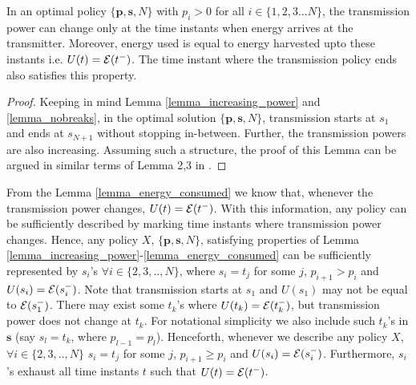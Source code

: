 %
%

\begin{lemma}
In an optimal policy $\{\bm{p},\bm{s},N\}$ with $p_i>0$ for all $i\in\{1,2,3...N\}$, the transmission power can change only at the time instants when energy arrives at the transmitter. Moreover, energy used is equal to energy harvested upto these instants i.e. $U(t) = \mathcal{E}(t^-)$. The time instant where the transmission policy ends also satisfies this property.
\label{lemma_energy_consumed} 
\end{lemma}
\begin{proof}
Keeping in mind Lemma \ref{lemma_increasing_power} and \ref{lemma_nobreaks}, in the optimal solution $\{\bm{p}, \bm{s}, N\}$, transmission starts at $s_1$ and ends at $s_{N+1}$ without stopping in-between. Further, the transmission powers are also increasing. Assuming such a structure, the proof of this Lemma can be argued in similar terms of Lemma 2,3 in \cite{Yang}. 
\end{proof}	

From the Lemma \ref{lemma_energy_consumed} we know that, whenever the transmission power changes, $ U(t) = \mathcal{E}(t^-)$. With this information, any policy can be sufficiently described by marking time instants where transmission power changes. Hence, any policy $X$, $\{\bm{p},\bm{s},N\}$, satisfying properties of Lemma \ref{lemma_increasing_power}-\ref{lemma_energy_consumed} can be sufficiently represented by $s_i$'s $\forall i\in\{2,3,..,N\}$, where $s_i=t_j$ for some $j$, $p_{i+1}>p_i$ and $U(s_i)=\mathcal{E}(s_i^-)$. Note that transmission starts at $s_1$ and $U(s_1)$ may not be equal to $\mathcal{E}(s_1^-)$. There may exist some $t_k$'s where $U(t_k)=\mathcal{E}(t_k^-)$, but transmission power does not change at $t_k$. For notational simplicity we also include such $t_k$'s in $\bm{s}$ (say $s_l=t_k$, where $p_{l-1}=p_l$). Henceforth, whenever we describe any policy $X$, $\forall i\in\{2,3,..,N\}$ $s_i=t_j$ for some $j$, $p_{i+1}\ge p_i$ and $U(s_i)=\mathcal{E}(s_i^-)$. Furthermore, $s_i$'s exhaust all time instants $t$ such that $U(t)= \mathcal{E}(t^-)$.
  
